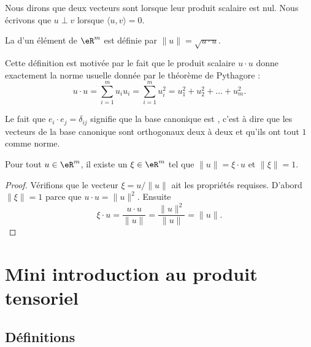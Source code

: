 Nous dirons que deux vecteurs sont  lorsque leur produit scalaire est nul. Nous écrivons que $u\perp v$ lorsque $\langle u, v\rangle =0$.
\begin{definition}	\label{DefNormeEucleApp}
	La  d'un élément de $\eR^m$ est définie par $\| u \|=\sqrt{u\cdot u}$.
\end{definition}

Cette définition est motivée par le fait que le produit scalaire $u\cdot u$ donne exactement la norme usuelle donnée par le théorème de Pythagore :
\begin{equation}
	u\cdot u=\sum_{i=1}^mu_iu_i=\sum_{i=1}^m u_i^2=u_1^2+u_2^2+\ldots+u_m^2.
\end{equation}

Le fait que $e_i\cdot e_j=\delta_{ij}$ signifie que la base canonique est , c'est à dire que les vecteurs de la base canonique sont orthogonaux deux à deux et qu'ils ont tout $1$ comme norme.

\begin{lemma}\label{LemSclNormeXi}
	Pour tout $u\in\eR^m$, il existe un $\xi\in\eR^m$ tel que $\| u \|=\xi\cdot u$ et $\| \xi \|=1$.
\end{lemma}

\begin{proof}
	Vérifions que le vecteur $\xi=u/\| u \|$ ait les propriétés requises. D'abord $\| \xi \|=1$ parce que $u\cdot u=\| u \|^2$. Ensuite
	\begin{equation}
		\xi\cdot u=\frac{ u\cdot u }{ \| u \| }=\frac{ \| u \|^2 }{ \| u \| }=\| u \|.
	\end{equation}
\end{proof}

\section{Mini introduction au produit tensoriel}
\label{SeOOpHsn}

\subsection{Définitions}

